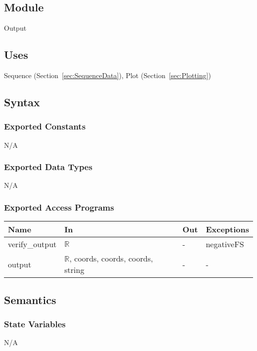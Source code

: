 \documentclass[12pt, titlepage]{article}
\begin{document}
\subsection{Module}
Output

\subsection{Uses}

Sequence (Section~\ref{sec:SequenceData}), Plot (Section~\ref{sec:Plotting})

\subsection{Syntax}

\subsubsection{Exported Constants}
N/A

\subsubsection{Exported Data Types}
N/A

\subsubsection{Exported Access Programs}

\begin{center}
	\renewcommand*{\arraystretch}{1.5}
	\begin{tabular} {p{}  p{}  p{} 
			p{} } \hline 
		\textbf{Name} & \textbf{In} & \textbf{Out} & \textbf{Exceptions} \\ 
		\hline
		
		verify\_output & $\mathbb{R}$ & - & negativeFS \\
		output & $\mathbb{R}$, coords, coords, coords, string & - & - \\ \hline
	\end{tabular}
\end{center}

\subsection{Semantics}

\subsubsection{State Variables}
N/A
\end{document}
